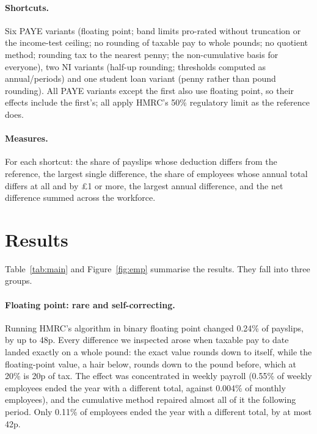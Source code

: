 \documentclass[11pt]{article}
\begin{document}
\paragraph{Shortcuts.} Six PAYE variants (floating point; band limits pro-rated without truncation or the income-test ceiling; no
rounding of taxable pay to whole pounds; no quotient method; rounding tax to the nearest penny; the non-cumulative basis for everyone),
two NI variants (half-up rounding; thresholds computed as annual/periods) and one student loan variant (penny rather than pound
rounding). All PAYE variants except the first also use floating point, so their effects include the first's; all apply HMRC's 50\%
regulatory limit as the reference does.

\paragraph{Measures.} For each shortcut: the share of payslips whose deduction differs from the reference, the largest single
difference, the share of employees whose annual total differs at all and by \pounds1 or more, the largest annual difference, and the
net difference summed across the workforce.

\section{Results}


Table~\ref{tab:main} and Figure~\ref{fig:emp} summarise the results. They fall into three groups.

\paragraph{Floating point: rare and self-correcting.} Running HMRC's algorithm in binary floating point changed 0.24\% of payslips, by up
to 48p. Every difference we inspected arose when taxable pay to date landed exactly on a whole pound: the exact value rounds down to
itself, while the floating-point value, a hair below, rounds down to the pound before, which at 20\% is 20p of tax. The effect was
concentrated in weekly payroll (0.55\% of weekly employees ended the year with a different total, against 0.004\% of monthly employees),
and the cumulative method repaired almost all of it the following period. Only 0.11\% of employees ended the year with a different total,
by at most 42p.
\end{document}
